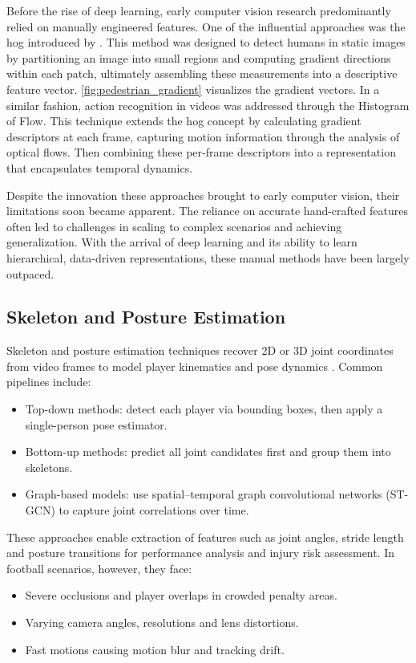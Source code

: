 Before the rise of deep learning, early computer vision research predominantly relied on manually engineered features. One of the influential approaches was the \acrfull{hog} introduced by \textcite{dalal_histogram_of_gradients}. This method was designed to detect humans in static images by partitioning an image into small regions and computing gradient directions within each patch, ultimately assembling these measurements into a descriptive feature vector. \autoref{fig:pedestrian_gradient} visualizes the gradient vectors. In a similar fashion, action recognition in videos was addressed through the Histogram of Flow\cite{dalal_histogram_of_flow}. This technique extends the \acrshort{hog} concept by calculating gradient descriptors at each frame, capturing motion information through the analysis of optical flows. Then combining these per-frame descriptors into a representation that encapsulates temporal dynamics. 

Despite the innovation these approaches brought to early computer vision, their limitations soon became apparent. The reliance on accurate hand-crafted features often led to challenges in scaling to complex scenarios and achieving generalization. With the arrival of deep learning and its ability to learn hierarchical, data-driven representations, these manual methods have been largely outpaced. 

\subsection{Skeleton and Posture Estimation}
\label{ssec:skeleton_posture_estimation}

Skeleton and posture estimation techniques recover 2D or 3D joint coordinates from video frames to model player kinematics and pose dynamics \cite{elaoud_skeleton-based_2020, wang_skeleton_two-stream_2023, reilly__skeleton_just_pi_2023}. Common pipelines include:
\begin{itemize}
    \item Top-down methods: detect each player via bounding boxes, then apply a single-person pose estimator.
    \item Bottom-up methods: predict all joint candidates first and group them into skeletons.
    \item Graph-based models: use spatial–temporal graph convolutional networks (ST-GCN) to capture joint correlations over time\cite{yan_spatial_temporal_graph_convolutional_2018}.
\end{itemize}
These approaches enable extraction of features such as joint angles, stride length and posture transitions for performance analysis and injury risk assessment. In football scenarios, however, they face:
\begin{itemize}
    \item Severe occlusions and player overlaps in crowded penalty areas.
    \item Varying camera angles, resolutions and lens distortions.
    \item Fast motions causing motion blur and tracking drift\cite{survey_of_survey}.
\end{itemize} 


